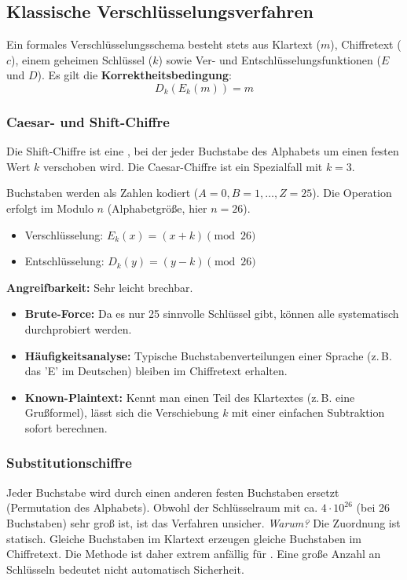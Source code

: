 \documentclass[
../../css_summary.tex,
]
{subfiles}
\begin{document}
\subsection{Klassische Verschlüsselungsverfahren}

Ein formales Verschlüsselungsschema besteht stets aus Klartext ($m$), Chiffretext ($c$), einem geheimen Schlüssel ($k$) sowie Ver- und Entschlüsselungsfunktionen ($E$ und $D$).
Es gilt die \textbf{Korrektheitsbedingung}: \[ D_k(E_k(m)) = m \]

\subsubsection{Caesar- und Shift-Chiffre}
Die Shift-Chiffre ist eine , bei der jeder Buchstabe des Alphabets um einen festen Wert $k$ verschoben wird. Die Caesar-Chiffre ist ein Spezialfall mit $k=3$.

\begin{defbox}
   Buchstaben werden als Zahlen kodiert ($A=0, B=1, \dots, Z=25$). Die Operation erfolgt im Modulo $n$ (Alphabetgröße, hier $n=26$).
   \begin{itemize}
      \item Verschlüsselung: $E_k(x) = (x + k) \pmod{26}$
      \item Entschlüsselung: $D_k(y) = (y - k) \pmod{26}$
   \end{itemize}
\end{defbox}

\textbf{Angreifbarkeit:} Sehr leicht brechbar.
\begin{itemize}
   \item \textbf{Brute-Force:} Da es nur 25 sinnvolle Schlüssel gibt, können alle systematisch durchprobiert werden.
   \item \textbf{Häufigkeitsanalyse:} Typische Buchstabenverteilungen einer Sprache (z.\,B. das 'E' im Deutschen) bleiben im Chiffretext erhalten.
   \item \textbf{Known-Plaintext:} Kennt man einen Teil des Klartextes (z.\,B. eine Grußformel), lässt sich die Verschiebung $k$ mit einer einfachen Subtraktion sofort berechnen.
\end{itemize}

\subsubsection{Substitutionschiffre}
Jeder Buchstabe wird durch einen anderen festen Buchstaben ersetzt (Permutation des Alphabets).
Obwohl der Schlüsselraum mit ca. $4 \cdot 10^{26}$ (bei 26 Buchstaben) sehr groß ist, ist das Verfahren unsicher.
\textit{Warum?} Die Zuordnung ist statisch. Gleiche Buchstaben im Klartext erzeugen gleiche Buchstaben im Chiffretext. Die Methode ist daher extrem anfällig für . Eine große Anzahl an Schlüsseln bedeutet nicht automatisch Sicherheit.
\end{document}
